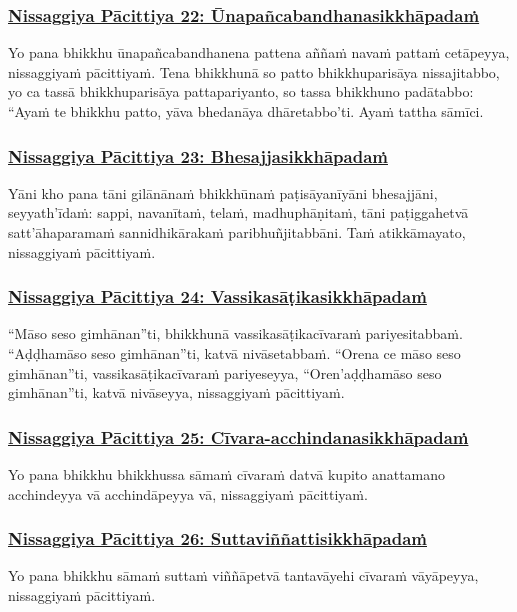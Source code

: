 \subsubsection*{\hyperref[forf-exp22]{Nissaggiya Pācittiya 22: Ūnapañcabandhanasikkhāpadaṁ}}
\label{np22}
Yo pana bhikkhu ūnapañcabandhanena pattena aññaṁ navaṁ pattaṁ cetāpeyya, nissaggiyaṁ pācittiyaṁ. Tena bhikkhunā so patto bhikkhuparisāya nissajitabbo, yo ca tassā bhikkhuparisāya pattapariyanto, so tassa bhikkhuno padātabbo: ``Ayaṁ te bhikkhu patto, yāva bhedanāya dhāretabbo'ti. Ayaṁ tattha sāmīci.

\subsubsection*{\hyperref[forf-exp23]{Nissaggiya Pācittiya 23: Bhesajjasikkhāpadaṁ}}
\label{np23}
Yāni kho pana tāni gilānānaṁ bhikkhūnaṁ paṭisāyanīyāni bhesajjāni, seyyath'īdaṁ: sappi, navanītaṁ, telaṁ, madhuphāṇitaṁ, tāni paṭiggahetvā satt'āhaparamaṁ sannidhikārakaṁ paribhuñjitabbāni. Taṁ atikkāmayato, nissaggiyaṁ pācittiyaṁ.

\subsubsection*{\hyperref[forf-exp24]{Nissaggiya Pācittiya 24: Vassikasāṭikasikkhāpadaṁ}}
\label{np24}
``Māso seso gimhānan''ti, bhikkhunā vassikasāṭikacīvaraṁ pariyesitabbaṁ. ``Aḍḍhamāso seso gimhānan''ti, katvā nivāsetabbaṁ. ``Orena ce māso seso gimhānan''ti, vassikasāṭikacīvaraṁ pariyeseyya, ``Oren'aḍḍhamāso seso gimhānan''ti, katvā nivāseyya, nissaggiyaṁ pācittiyaṁ.

\subsubsection*{\hyperref[forf-exp25]{Nissaggiya Pācittiya 25: Cīvara-acchindanasikkhāpadaṁ}}
\label{np25}
Yo pana bhikkhu bhikkhussa sāmaṁ cīvaraṁ datvā kupito anattamano acchindeyya vā acchindāpeyya vā, nissaggiyaṁ pācittiyaṁ.

\subsubsection*{\hyperref[forf-exp26]{Nissaggiya Pācittiya 26: Suttaviññattisikkhāpadaṁ}}
\label{np26}
Yo pana bhikkhu sāmaṁ suttaṁ viññāpetvā tantavāyehi cīvaraṁ vāyāpeyya, nissaggiyaṁ pācittiyaṁ.

